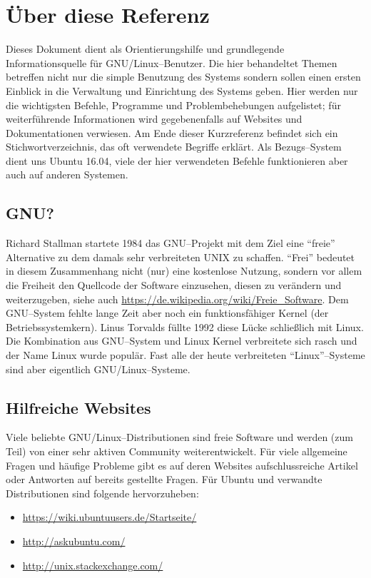 \section {Über diese Referenz}
Dieses Dokument dient als Orientierungshilfe und grundlegende Informationsquelle für GNU/Linux--Benutzer. Die hier behandeltet Themen betreffen nicht nur die simple Benutzung des Systems sondern sollen einen ersten Einblick in die Verwaltung und Einrichtung des Systems geben. Hier werden nur die wichtigsten Befehle, Programme und Problembehebungen aufgelistet; für weiterführende Informationen wird gegebenenfalls auf Websites und Dokumentationen verwiesen. Am Ende dieser Kurzreferenz befindet sich ein Stichwortverzeichnis, das oft verwendete Begriffe erklärt. Als Bezugs--System dient uns Ubuntu 16.04, viele der hier verwendeten Befehle funktionieren aber auch auf anderen Systemen.

\subsection{GNU?}
Richard Stallman startete 1984 das GNU--Projekt mit dem Ziel eine ``freie'' Alternative zu dem damals sehr verbreiteten UNIX zu schaffen. ``Frei'' bedeutet in diesem Zusammenhang nicht (nur) eine kostenlose Nutzung, sondern vor allem die Freiheit den Quellcode der Software einzusehen, diesen zu verändern und weiterzugeben, siehe auch \url{https://de.wikipedia.org/wiki/Freie_Software}. Dem GNU--System fehlte lange Zeit aber noch ein funktionsfähiger Kernel (der Betriebssystemkern). Linus Torvalds füllte 1992 diese Lücke schließlich mit Linux. Die Kombination aus GNU--System und Linux Kernel verbreitete sich rasch und der Name Linux wurde populär. Fast alle der heute verbreiteten ``Linux''--Systeme sind aber eigentlich GNU/Linux--Systeme.

\subsection {Hilfreiche Websites}
Viele beliebte GNU/Linux--Distributionen sind freie Software und werden (zum Teil) von einer sehr aktiven Community weiterentwickelt. Für viele allgemeine Fragen und häufige Probleme gibt es auf deren Websites aufschlussreiche Artikel oder Antworten auf bereits gestellte Fragen. Für Ubuntu und verwandte Distributionen sind folgende hervorzuheben:

\begin{itemize}
	\item \url{https://wiki.ubuntuusers.de/Startseite/}
	\item \url{http://askubuntu.com/}
	\item \url{http://unix.stackexchange.com/}
\end{itemize}
